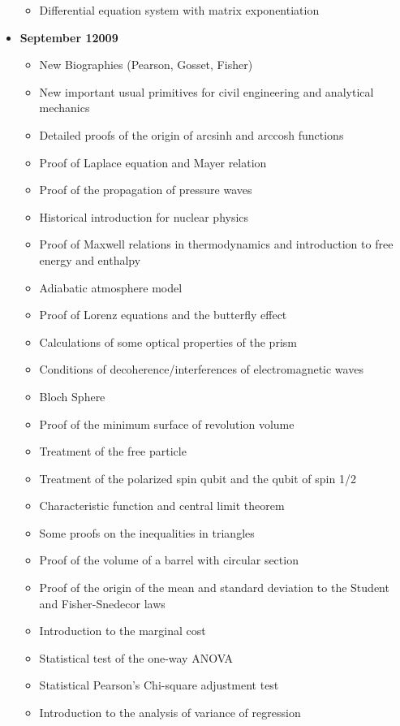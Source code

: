 \begin{itemize}
\begin{itemize}[noitemsep]
			\item Differential equation system with matrix exponentiation
		\end{itemize}
	\item \textbf{September 12009}
		\begin{itemize}[noitemsep]
			\item New Biographies (Pearson, Gosset, Fisher)
			\item New important usual primitives for civil engineering and analytical mechanics
			\item Detailed proofs of the origin of arcsinh and arccosh functions
			\item Proof of Laplace equation and Mayer relation
			\item Proof of the propagation of pressure waves
			\item Historical introduction for nuclear physics
			\item Proof of Maxwell relations in thermodynamics and introduction to free energy and enthalpy
			\item Adiabatic atmosphere model
			\item Proof of Lorenz equations and the butterfly effect
			\item Calculations of some optical properties of the prism
			\item Conditions of decoherence/interferences of electromagnetic waves
			\item Bloch Sphere
			\item Proof of the minimum surface of revolution volume
			\item Treatment of the free particle
			\item Treatment of the polarized spin qubit and the qubit of spin 1/2
			\item Characteristic function and central limit theorem
			\item Some proofs on the inequalities in triangles
			\item Proof of the volume of a barrel with circular section 
			\item Proof of the origin of the mean and standard deviation to the Student and Fisher-Snedecor laws
			\item Introduction to the marginal cost
			\item Statistical test of the one-way ANOVA
			\item Statistical Pearson's Chi-square adjustment test  
			\item Introduction to the analysis of variance of regression

\end{itemize}
\end{itemize}
